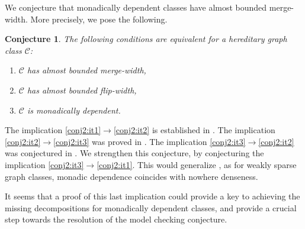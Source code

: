 \documentclass[11pt]{article}
\newtheorem{conjecture}[theorem]{Conjecture}
\theoremstyle{remark}
\def\cal{\mathcal}
\newcommand{\CC}{\cal C}
\begin{document}
We conjecture that monadically dependent classes have almost bounded merge-width.
More precisely, we pose the following.



\begin{conjecture}\label{conj:almostboundedmergewidth}
The following conditions are equivalent for a hereditary graph class $\CC$:
\begin{enumerate}
  \item\label{conj2:it1} $\CC$ has almost bounded merge-width,
  \item\label{conj2:it2} $\CC$ has almost bounded flip-width,
  \item\label{conj2:it3} $\CC$ is monadically dependent.
\end{enumerate}
\end{conjecture}

The implication \eqref{conj2:it1}$\rightarrow$\eqref{conj2:it2} is established in .
The implication \eqref{conj2:it2}$\rightarrow$\eqref{conj2:it3} was proved in \cite{flip-breakability}. The implication \eqref{conj2:it3}$\rightarrow$\eqref{conj2:it2} was conjectured in \cite{flip-width}. We strengthen this conjecture, by conjecturing the implication \eqref{conj2:it3}$\rightarrow$\eqref{conj2:it1}.
This would generalize , as for weakly sparse graph classes, monadic dependence coincides with nowhere denseness.


It seems that a proof of this last implication
could provide a key to achieving the missing
decompositions for monadically dependent classes, and provide a crucial step towards the resolution of the model checking conjecture.





\end{document}
